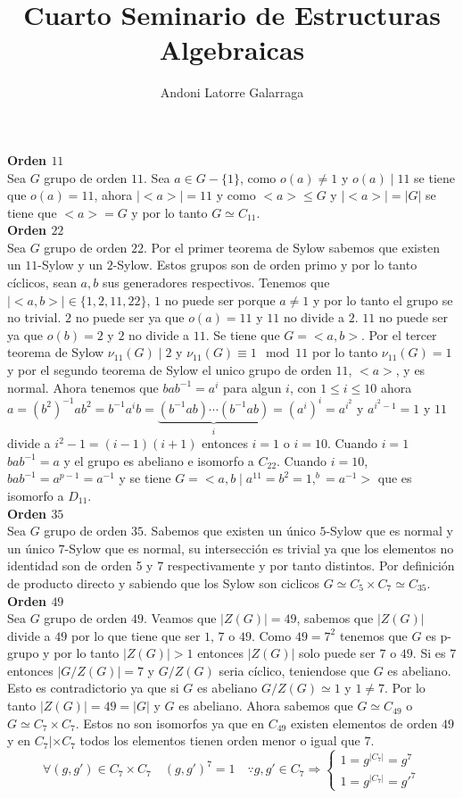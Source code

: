 \documentclass{article}
\title{Cuarto Seminario de Estructuras Algebraicas}
\author{Andoni Latorre Galarraga}
\date{}
\begin{document}
\maketitle

\textbf{Orden $11$}\\
Sea $G$ grupo de orden $11$. Sea $a\in G-\{1\}$, como $o(a)\ne 1$ y $o(a)\mid 11$ se tiene que $o(a)=11$, ahora $|<a>|=11$ y como $<a>\le G$ y $|<a>|=|G|$ se tiene que $<a>=G$ y por lo tanto $G\simeq C_{11}$.\\

\textbf{Orden $22$}\\
Sea $G$ grupo de orden $22$. Por el primer teorema de Sylow sabemos que existen un $11$-Sylow y un $2$-Sylow. Estos grupos son de orden primo y por lo tanto cíclicos, sean $a,b$ sus generadores respectivos. Tenemos que $|<a,b>|\in \{1,2,11,22\}$, $1$ no puede ser porque $a\ne 1$ y por lo tanto el grupo se no trivial. $2$ no puede ser ya que $o(a)=11$ y $11$ no divide a $2$. $11$ no puede ser ya que $o(b)=2$ y $2$ no divide a $11$. Se tiene que $G=<a,b>$. Por el tercer teorema de Sylow $\nu_{11}(G)\mid 2$ y $\nu_{11}(G)\equiv 1 \mod 11$ por lo tanto $\nu_{11}(G)=1$ y por el segundo teorema de Sylow el unico grupo de orden $11$, $<a>$, y es normal. Ahora tenemos que $bab^{-1}=a^i$ para algun $i$, con $1\le i \le 10$ ahora $a=(b^2)^{-1}ab^2=b^{-1}a^ib=\underbrace{(b^{-1}ab)\cdots (b^{-1}ab)}_i=(a^i)^i=a^{i^2}$ y $a^{i^2-1}=1$ y $11$ divide a $i^2-1=(i-1)(i+1)$ entonces $i=1$ o $i=10$. Cuando $i=1$ $bab^{-1}=a$ y el grupo es abeliano e isomorfo a $C_{22}$. Cuando $i=10$, $bab^{-1}=a^{p-1}=a^{-1}$ y se tiene $G=<a,b\mid a^{11} = b^2 =1 ,^b=a^{-1}>$ que es isomorfo a $D_{11}$.\\

\textbf{Orden $35$}\\
Sea $G$ grupo de orden $35$. Sabemos que existen un único $5$-Sylow que es normal y un único $7$-Sylow que es normal, su intersección es trivial ya que los elementos no identidad son de orden 5 y 7 respectivamente y por tanto distintos. Por definición de producto directo y sabiendo que los Sylow son ciclicos $G\simeq C_5\times C_7\simeq C_{35}$.\\

\textbf{Orden $49$}\\
Sea $G$ grupo de orden $49$. Veamos que $|Z(G)|=49$, sabemos que $|Z(G)|$ divide a $49$ por lo que tiene que ser $1$, $7$ o $49$. Como $49=7^2$ tenemos que $G$ es p-grupo y por lo tanto $|Z(G)|>1$ entonces $|Z(G)|$ solo puede ser $7$ o $49$. Si es $7$ entonces $\left| G/Z(G) \right| = 7$ y $G/Z(G)$ seria cíclico, teniendose que $G$ es abeliano. Esto es contradictorio ya que si $G$ es abeliano $G/Z(G)\simeq 1$ y $1\ne 7$. Por lo tanto $|Z(G)|=49=|G|$ y $G$ es abeliano. Ahora sabemos que $G\simeq C_{49}$ o $G\simeq C_{7}\times C_{7}$. Estos no son isomorfos ya que en $C_{49}$ existen elementos de orden $49$ y en $C_{7}|\times C_{7}$ todos los elementos tienen orden menor o igual que $7$.
$$
\forall (g,g')\in C_7\times C_7 \quad (g,g')^7=1 \quad \because g,g'\in C_7 \Rightarrow
\left\{\begin{array}{l}
1=g^{|C_7|}=g^7\\
1=g^{|C_7|}=g'^7
\end{array}\right.
$$
\end{document}
